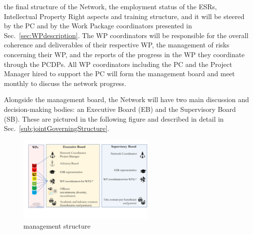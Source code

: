 the final structure of the Network, the employment status of the ESRs,
Intellectual Property Right aspects and training structure, and it
will be steered by the PC and by the Work Package coordinators presented
in Sec.~\ref{sec:WPdescription}.%
The WP coordinators will be responsible for the overall coherence and
deliverables of their respective WP, the management of risks
concerning their WP, and the reports of the progress in the WP they
coordinate through the PCDPs. All WP coordinators including the PC and the Project Manager hired to support the PC will form
the \acronym management board and meet monthly to discuss the network progress. 

Alongside the management board, the Network will have two main discussion and decision-making bodies:
an Executive Board (EB) and the Supervisory Board (SB).
These are pictured in the following figure and described in detail in Sec.~\ref{sub:jointGoverningStructure}. 


\begin{figure}
\begin{center}
\includegraphics[width=0.6\textwidth]{figs/ManagementStructure} %
\caption{\acronym management structure}
\label{fig:management}
\end{center}
\vspace{-5mm}
\end{figure}

